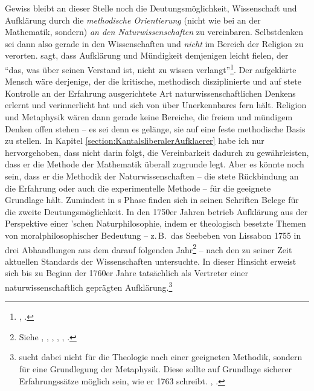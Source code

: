 Gewiss bleibt an dieser Stelle noch die Deutungsmöglichkeit, Wissenschaft und
Aufklärung durch die \emph{methodische Orientierung} (nicht wie bei
 an der Mathematik, sondern) \emph{an den
Naturwissenschaften} zu vereinbaren. Selbstdenken sei dann also gerade in den
Wissenschaften und \emph{nicht} im Bereich der Religion zu verorten.
 sagt, dass Aufklärung und Mündigkeit demjenigen leicht
fielen, der \enquote{das, was über seinen Verstand ist, nicht zu wissen
verlangt}\footnote{\cite[\S 40]{Kant:KritikderUrteilskraft2009}, \cite[V:
294.32--33]{Kant:GesammelteWerke1900ff.}.}. Der aufgeklärte Mensch wäre
derjenige, der die kritische, methodisch disziplinierte und auf stete Kontrolle
an der Erfahrung ausgerichtete Art naturwissenschaftlichen Denkens erlernt und
verinnerlicht hat und sich von  über Unerkennbares fern
hält. Religion und Metaphysik wären dann gerade keine Bereiche, die freiem und
mündigem Denken offen stehen --  es sei denn es gelänge, sie auf eine feste
methodische Basis zu stellen. In Kapitel
\ref{section:KantalsliberalerAufklaerer} habe ich nur hervorgehoben, dass
  nicht darin
folgt, die Vereinbarkeit dadurch zu gewährleisten, dass er die Methode der
Mathematik überall zugrunde legt. Aber es könnte noch sein, dass er die Methodik
der Naturwissenschaften -- die stete Rückbindung an die Erfahrung oder auch die
experimentelle Methode -- für die geeignete Grundlage hält. Zumindest in
s  Phase finden sich in seinen
Schriften Belege für die zweite Deutungsmöglichkeit.
\label{anm:jungerkantundaufklaerung}In den 1750er Jahren betrieb
 Aufklärung aus der Perspektive einer
'schen Naturphilosophie, indem er theologisch besetzte
Themen von moralphilosophischer Bedeutung -- z.\,B.\ das Seebeben von Lissabon
1755 in drei Abhandlungen aus dem darauf folgenden
Jahr\footnote{Siehe
\cite{Kant:VondenUrsachenderErderschuetterungenbeiGelegenheitdesUnglueckswelchesdiewestlicheLaendervonEuropagegendasEndedesvorigenJahresbetroffenhat1910},
\cite[][I: 417--427]{Kant:GesammelteWerke1900ff.},
\cite{Kant:GeschichteundNaturbeschreibungdermerkwuerdigstenVorfaelledesErdbebenswelchesandemEndedes1755stenJahreseinengrossenTheilderErdeerschuetterthat1910},
\cite[][I: 429--461]{Kant:GesammelteWerke1900ff.},
\cite{Kant:FortgesetzteBetrachtungderseiteinigerZeitwahrgenommenenErderschuetterungen1910}, \cite[vgl.][I:
463--472]{Kant:GesammelteWerke1900ff.}.} -- nach den zu seiner Zeit aktuellen
Standards der Wissenschaften untersuchte.  In dieser Hinsicht erweist sich
 bis zu Beginn der 1760er Jahre tatsächlich als
Vertreter einer naturwissenschaftlich geprägten Aufklärung.\footnote{
sucht dabei nicht für die Theologie nach einer geeigneten Methodik, sondern für eine Grundlegung der Metaphysik.
Diese sollte auf Grundlage sicherer Erfahrungssätze möglich sein, wie er 1763
schreibt. \cite[Vgl.][A
69f.]{Kant:UntersuchungueberdieDeutlichkeitderGrundsaetzedernatuerlichenTheologieundderMoral1977},
\cite[][II: 275.8--24]{Kant:GesammelteWerke1900ff.}.}

